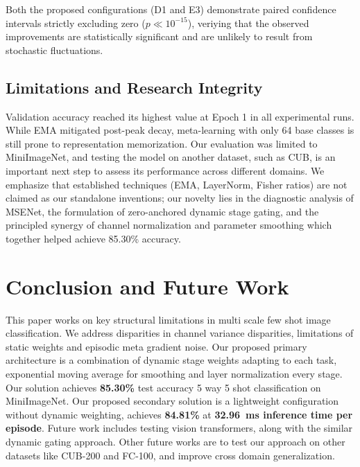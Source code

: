 \documentclass[conference]{IEEEtran}
\begin{document}
Both the proposed configurations (D1 and E3) demonstrate paired confidence intervals strictly excluding zero ($p \ll 10^{-15}$), veriying that the observed improvements are statistically significant and are unlikely to result from stochastic fluctuations.

\subsection{Limitations and Research Integrity}

Validation accuracy reached its highest value at Epoch 1 in all experimental runs. While EMA mitigated post-peak decay, meta-learning with only 64 base classes is still prone to representation memorization. Our evaluation was limited to MiniImageNet, and testing the model on another dataset, such as CUB, is an important next step to assess its performance across different domains. We emphasize that established techniques (EMA, LayerNorm, Fisher ratios) are not claimed as our standalone inventions; our novelty lies in the diagnostic analysis of MSENet, the formulation of zero-anchored dynamic stage gating, and the principled synergy of channel normalization and parameter smoothing which together helped achieve 85.30\% accuracy.

\section{Conclusion and Future Work}
This paper works on key structural limitations in multi scale few shot image classification. We address disparities in channel variance disparities, limitations of static weights and episodic meta gradient noise. Our proposed primary architecture is a combination of dynamic stage weights adapting to each task, exponential moving average for smoothing and layer normalization every stage. Our solution achieves   \textbf{85.30\%} test accuracy 5 way 5 shot classification on MiniImageNet. Our proposed secondary solution is a lightweight configuration without dynamic weighting, achieves \textbf{84.81\%} at \textbf{32.96~ms inference time per episode}.
Future work includes testing vision transformers, along with the similar dynamic gating approach. Other future works are to test our approach on other datasets like CUB-200 and FC-100, and improve cross domain generalization. 
\end{document}
